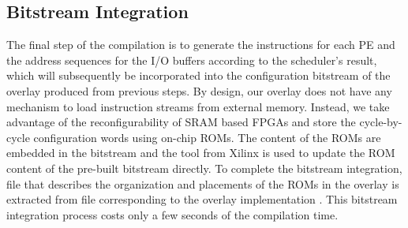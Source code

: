 \subsection{Bitstream Integration}
The final step of the compilation is to generate the instructions for each PE and the address sequences for the I/O buffers according to the scheduler's result, which will subsequently be incorporated into the configuration bitstream of the overlay produced from previous steps.
By design, our overlay does not have any mechanism to load instruction streams from external memory.
Instead, we take advantage of the reconfigurability of SRAM based FPGAs and store the cycle-by-cycle configuration words using on-chip ROMs. The content of the ROMs are embedded in the bitstream and the  tool from Xilinx \cite{data2mem} is used to update the ROM content of the pre-built bitstream directly. To complete the bitstream integration,  file that describes the organization and placements of the ROMs in the overlay is extracted from  file corresponding to the overlay implementation \cite{beckhoff2011xilinx}.
This bitstream integration process costs only a few seconds of the compilation time.



